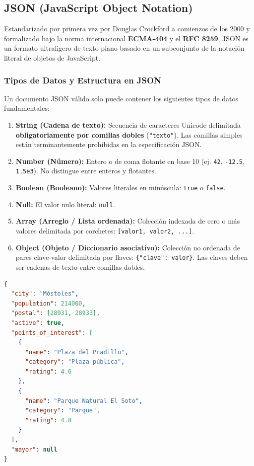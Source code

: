 \subsection{JSON (JavaScript Object Notation)}

Estandarizado por primera vez por Douglas Crockford a comienzos de los 2000 y formalizado bajo la norma internacional \textbf{ECMA-404} y el \textbf{RFC 8259}, JSON es un formato ultraligero de texto plano basado en un subconjunto de la notación literal de objetos de JavaScript.

\subsubsection{Tipos de Datos y Estructura en JSON}
Un documento JSON válido solo puede contener los siguientes tipos de datos fundamentales:

\begin{enumerate}
  \item \textbf{String (Cadena de texto):} Secuencia de caracteres Unicode delimitada \textbf{obligatoriamente por comillas dobles} (\texttt{"texto"}). Las comillas simples están terminantemente prohibidas en la especificación JSON.
  \item \textbf{Number (Número):} Entero o de coma flotante en base 10 (ej. \texttt{42}, \texttt{-12.5}, \texttt{1.5e3}). No distingue entre enteros y flotantes.
  \item \textbf{Boolean (Booleano):} Valores literales en minúscula: \texttt{true} o \texttt{false}.
  \item \textbf{Null:} El valor nulo literal: \texttt{null}.
  \item \textbf{Array (Arreglo / Lista ordenada):} Colección indexada de cero o más valores delimitada por corchetes: \texttt{[valor1, valor2, ...]}.
  \item \textbf{Object (Objeto / Diccionario asociativo):} Colección no ordenada de pares clave-valor delimitada por llaves: \texttt{\{"clave": valor\}}. Las claves deben ser cadenas de texto entre comillas dobles.
\end{enumerate}

\begin{lstlisting}[language=json, caption={Ejemplo completo de objeto JSON estructurado con arrays y tipos mixtos.}]
{
  "city": "Móstoles",
  "population": 214000,
  "postal": [28931, 28933],
  "active": true,
  "points_of_interest": [
    {
      "name": "Plaza del Pradillo",
      "category": "Plaza pública",
      "rating": 4.6
    },
    {
      "name": "Parque Natural El Soto",
      "category": "Parque",
      "rating": 4.8
    }
  ],
  "mayor": null
}
\end{lstlisting}

